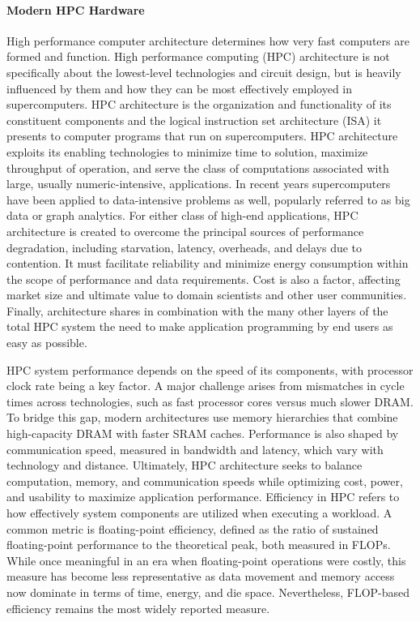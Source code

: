 \paragraph{Modern HPC Hardware}
\label{sec:background_hpc_hardware}
High performance computer architecture determines how very fast computers are formed and function. High performance computing (HPC) architecture is not specifically about the lowest-level technologies and circuit design, but is heavily influenced by them and how they can be most effectively employed in supercomputers. HPC architecture is the organization and functionality of its constituent components and the logical instruction set architecture (ISA) it presents to computer programs that run on supercomputers. HPC architecture exploits its enabling technologies to minimize time to solution, maximize throughput of operation, and serve the class of computations associated with large, usually numeric-intensive, applications. In recent years supercomputers have been applied to data-intensive problems as well, popularly referred to as big data or graph analytics. For either class of high-end applications, HPC architecture is created to overcome the principal sources of performance degradation, including starvation, latency, overheads, and delays due to contention. It must facilitate reliability and minimize energy consumption within the scope of performance and data requirements. Cost is also a factor, affecting market size and ultimate value to domain scientists and other user communities. Finally, architecture shares in combination with the many other layers of the total HPC system the need to make application programming by end users as easy as possible.

HPC system performance depends on the speed of its components, with processor clock rate being a key factor. A major challenge arises from mismatches in cycle times across technologies, such as fast processor cores versus much slower DRAM. To bridge this gap, modern architectures use memory hierarchies that combine high-capacity DRAM with faster SRAM caches. Performance is also shaped by communication speed, measured in bandwidth and latency, which vary with technology and distance. Ultimately, HPC architecture seeks to balance computation, memory, and communication speeds while optimizing cost, power, and usability to maximize application performance.
Efficiency in HPC refers to how effectively system components are utilized when executing a workload. A common metric is floating-point efficiency, defined as the ratio of sustained floating-point performance to the theoretical peak, both measured in FLOPs. While once meaningful in an era when floating-point operations were costly, this measure has become less representative as data movement and memory access now dominate in terms of time, energy, and die space. Nevertheless, FLOP-based efficiency remains the most widely reported measure.

